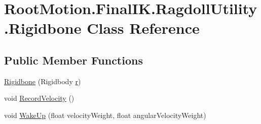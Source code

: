 \hypertarget{class_root_motion_1_1_final_i_k_1_1_ragdoll_utility_1_1_rigidbone}{}\section{Root\+Motion.\+Final\+I\+K.\+Ragdoll\+Utility.\+Rigidbone Class Reference}
\label{class_root_motion_1_1_final_i_k_1_1_ragdoll_utility_1_1_rigidbone}
\subsection*{Public Member Functions}
\begin{DoxyCompactItemize}
\item 
\mbox{\hyperlink{class_root_motion_1_1_final_i_k_1_1_ragdoll_utility_1_1_rigidbone_a31e04ddbf2413e7b71b78fe50707977e}{Rigidbone}} (Rigidbody \mbox{\hyperlink{class_root_motion_1_1_final_i_k_1_1_ragdoll_utility_1_1_rigidbone_ab061ab892c848657ae082a733f405441}{r}})
\item 
void \mbox{\hyperlink{class_root_motion_1_1_final_i_k_1_1_ragdoll_utility_1_1_rigidbone_ae43e651f2074d84c89a21657e43b93a8}{Record\+Velocity}} ()
\item 
void \mbox{\hyperlink{class_root_motion_1_1_final_i_k_1_1_ragdoll_utility_1_1_rigidbone_a62f0be20655eb4b28731f39294cf0239}{Wake\+Up}} (float velocity\+Weight, float angular\+Velocity\+Weight)
\end{DoxyCompactItemize}
